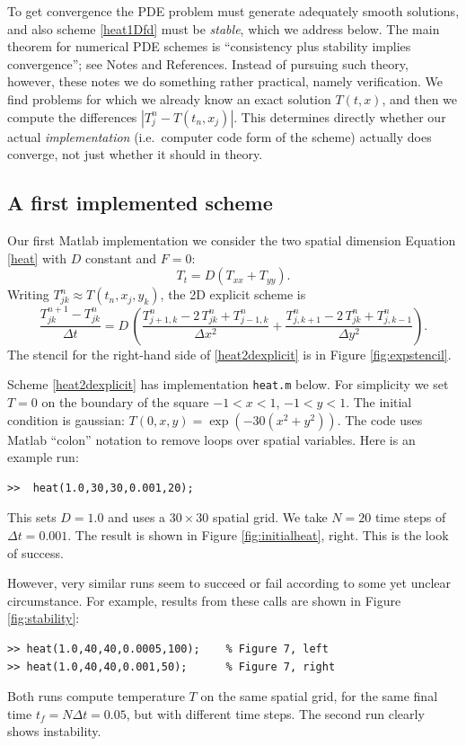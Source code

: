 \documentclass[letterpaper,final,12pt,reqno]{amsart}
\newcommand{\minput}[1]{
\vspace{0.8cm}
\VerbatimInput[frame=single,framesep=3mm,label=\fbox{\normalsize \textsl{\,#1.m\,}},fontfamily=courier,fontsize=\footnotesize]{tmp/#1.slim.m}
\vspace{0.5cm}
}
\begin{document}
To get convergence the PDE problem must generate adequately smooth solutions, and also scheme \eqref{heat1Dfd} must be \emph{stable}, which we address below.  The main theorem for numerical PDE schemes is ``consistency plus stability implies convergence''; see Notes and References.  Instead of pursuing such theory, however, these notes we do something rather practical, namely verification.  We find problems for which we already know an exact solution $T(t,x)$, and then we compute the differences $|T_j^n - T(t_n,x_j)|$.  This determines directly whether our actual \emph{implementation} (i.e.~computer code form of the scheme) actually does converge, not just whether it should in theory.

\subsection*{A first implemented scheme}  Our first Matlab implementation we consider the two spatial dimension Equation \eqref{heat} with $D$ constant and $F=0$:
\begin{equation}
T_t = D (T_{xx}+T_{yy}).\label{heat2D}
\end{equation}
Writing $T_{jk}^n \approx T(t_n,x_j,y_k)$, the 2D explicit scheme is
\begin{equation}
	\frac{T_{jk}^{n+1} - T_{jk}^n}{\Delta t} = D\,\left(\frac{T_{j+1,k}^n - 2\, T_{jk}^n + T_{j-1,k}^n}{\Delta x^2} + \frac{T_{j,k+1}^n - 2\, T_{jk}^n + T_{j,k-1}^n}{\Delta y^2}\right). \label{heat2dexplicit}
\end{equation}
The stencil for the right-hand side of \eqref{heat2dexplicit} is in Figure \ref{fig:expstencil}.

Scheme \eqref{heat2dexplicit} has implementation \texttt{heat.m} below.  For simplicity we set $T=0$ on the boundary of the square $-1 < x < 1$, $-1 < y < 1$.  The initial condition is gaussian: $T(0,x,y) = \exp(-30 (x^2+y^2))$.  The code uses Matlab ``colon'' notation to remove loops over spatial variables.  Here is an example run:
\begin{Verbatim}
>>  heat(1.0,30,30,0.001,20);
\end{Verbatim}
This sets $D=1.0$ and uses a $30\times 30$ spatial grid.  We take $N=20$ time steps of $\Delta t = 0.001$.  The result is shown in Figure \ref{fig:initialheat}, right.  This is the look of success.

\minput{heat}

However, very similar runs seem to succeed or fail according to some yet unclear circumstance.  For example, results from these calls are shown in Figure \ref{fig:stability}:
\begin{Verbatim}
>> heat(1.0,40,40,0.0005,100);    % Figure 7, left
>> heat(1.0,40,40,0.001,50);      % Figure 7, right
\end{Verbatim}
Both runs compute temperature $T$ on the same spatial grid, for the same final time $t_f = N \Delta t = 0.05$, but with different time steps.  The second run clearly shows instability.
\end{document}
